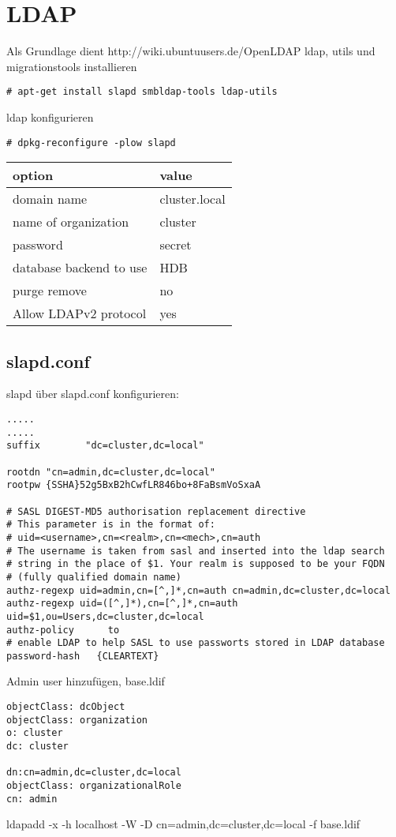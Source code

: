 \chapter{LDAP}
Als Grundlage dient http://wiki.ubuntuusers.de/OpenLDAP
ldap, utils und migrationstools installieren
\begin{lstlisting}[style=Bash]
# apt-get install slapd smbldap-tools ldap-utils
\end{lstlisting}
ldap konfigurieren
\begin{lstlisting}[style=Bash]
# dpkg-reconfigure -plow slapd
\end{lstlisting}
\begin{tabular}{ l | l }
 option & value\\
 \hline
 domain name & cluster.local\\
 name of organization & cluster\\
 password & secret\\
 database backend to use & HDB\\
 purge remove & no\\
 Allow LDAPv2 protocol & yes\\
\end{tabular}
\section{slapd.conf}
slapd über slapd.conf konfigurieren:
\begin{lstlisting}[style=Bash]
.....
.....
suffix        "dc=cluster,dc=local"

rootdn "cn=admin,dc=cluster,dc=local"
rootpw {SSHA}52g5BxB2hCwfLR846bo+8FaBsmVoSxaA

# SASL DIGEST-MD5 authorisation replacement directive
# This parameter is in the format of:
# uid=<username>,cn=<realm>,cn=<mech>,cn=auth
# The username is taken from sasl and inserted into the ldap search 
# string in the place of $1. Your realm is supposed to be your FQDN 
# (fully qualified domain name)
authz-regexp uid=admin,cn=[^,]*,cn=auth cn=admin,dc=cluster,dc=local
authz-regexp uid=([^,]*),cn=[^,]*,cn=auth uid=$1,ou=Users,dc=cluster,dc=local
authz-policy      to
# enable LDAP to help SASL to use passworts stored in LDAP database
password-hash   {CLEARTEXT}
\end{lstlisting}

Admin user hinzufügen, base.ldif
\begin{lstlisting}[style=Bash]
objectClass: dcObject
objectClass: organization
o: cluster
dc: cluster

dn:cn=admin,dc=cluster,dc=local
objectClass: organizationalRole
cn: admin
\end{lstlisting}
ldapadd -x -h localhost -W -D cn=admin,dc=cluster,dc=local -f base.ldif 

